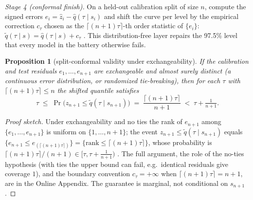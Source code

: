 \documentclass[11pt]{article}
\newtheorem{proposition}{Proposition}
\theoremstyle{remark}
\begin{document}
\emph{Stage 4 (conformal finish).} On a held-out calibration split of
size $n$, compute the signed errors
$e_i = \widehat{z}_i - \widehat{q}(\tau \mid s_i)$ and shift the curve
per level by the empirical correction $c_\tau$ chosen as the
$\lceil (n{+}1)\tau \rceil$-th order statistic of $\{e_i\}$:
$\widetilde{q}(\tau \mid s) = \widehat{q}(\tau \mid s) + c_\tau$
\citep{vovk2005, romano2019cqr}. This distribution-free layer repairs
the 97.5\% level that every model in the battery otherwise fails.

\begin{proposition}[split-conformal validity under
exchangeability]\label{prop:conformal}
If the calibration and test residuals $e_1,\dots,e_{n+1}$ are
exchangeable and almost surely distinct (a continuous error
distribution, or randomized tie-breaking), then for each $\tau$ with
$\lceil(n{+}1)\tau\rceil \le n$ the shifted quantile satisfies
\[
\tau \;\le\; \Pr\big(z_{n+1} \le \widetilde{q}(\tau \mid s_{n+1})\big)
\;=\; \frac{\lceil(n{+}1)\tau\rceil}{n+1}
\;<\; \tau + \tfrac{1}{n+1}.
\]
\end{proposition}
\begin{proof}[Proof sketch]
Under exchangeability and no ties the rank of $e_{n+1}$ among
$\{e_1,\dots,e_{n+1}\}$ is uniform on $\{1,\dots,n+1\}$; the event
$z_{n+1}\le\widetilde{q}(\tau\mid s_{n+1})$ equals $\{e_{n+1}\le
e_{(\lceil(n+1)\tau\rceil)}\}=\{\mathrm{rank}\le\lceil(n{+}1)\tau\rceil\}$,
whose probability is $\lceil(n{+}1)\tau\rceil/(n+1)\in[\tau,\tau+\tfrac1{n+1})$
\citep{vovk2005}. The full argument, the role of the no-ties
hypothesis (with ties the upper bound can fail, e.g.\ identical
residuals give coverage $1$), and the boundary convention
$c_\tau=+\infty$ when $\lceil(n{+}1)\tau\rceil=n+1$, are in
the Online Appendix. The guarantee is marginal, not conditional
on $s_{n+1}$.
\end{proof}
\end{document}
